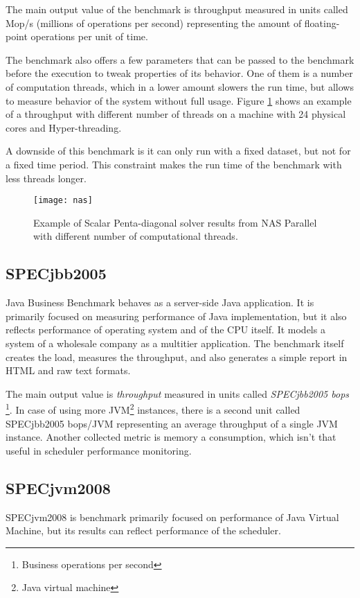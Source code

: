 The main output value of the benchmark is throughput measured in units called Mop/s
(millions of operations per second) representing the amount of floating-point
operations per unit of time.

The benchmark also offers a few parameters that can be passed to the benchmark
before the execution to tweak properties of its behavior. One of them is a number of
computation threads, which in a lower amount slowers the run time, but allows to
measure behavior of the system without full usage. Figure \ref{fig:nas} shows
an example of a throughput with different number of threads on a machine with 24 physical cores
and Hyper-threading.

A downside of this benchmark is it can only run with a fixed dataset, but not for a
fixed time period. This constraint makes the run time of the benchmark with less
threads longer.

\begin{figure}
  \centering
  \texttt{[image: nas]}
  \caption{Example of Scalar Penta-diagonal solver results from NAS Parallel with
    different number of computational threads.}
  \label{fig:nas}
\end{figure}

\subsection{SPECjbb2005}
Java Business Benchmark behaves as a server-side Java application. It is
primarily focused on measuring performance of Java implementation, but it also
reflects performance of operating system and of the CPU itself.
It models a system of a wholesale company as a multitier application. The benchmark
itself creates the load, measures the throughput, and also generates a simple
report in HTML and raw text formats.

The main output value is \emph{throughput} measured in units called
\emph{SPECjbb2005 bops} \footnote{Business operations per second}. In case of
using more JVM\footnote{Java virtual machine} instances, there is a second unit
called SPECjbb2005 bops/JVM representing an average throughput of a single JVM
instance. Another collected metric is memory a consumption, which isn't that
useful in scheduler performance monitoring.

\subsection{SPECjvm2008}
SPECjvm2008 is benchmark primarily focused on performance of Java Virtual
Machine, but its results can reflect performance of the scheduler.

